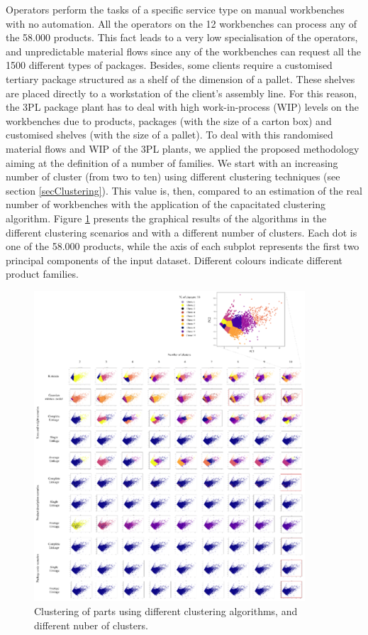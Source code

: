 Operators perform the tasks of a specific service type on manual workbenches with no automation. All the operators on the 12 workbenches can process any of the 58.000 products. This fact leads to a very low specialisation of the operators, and unpredictable material flows since any of the workbenches can request all the 1500 different types of packages. Besides, some clients require a customised tertiary package structured as a shelf of the dimension of a pallet. These shelves are placed directly to a workstation of the client’s assembly line. For this reason, the 3PL package plant has to deal with high work-in-process (WIP) levels on the workbenches due to products, packages (with the size of a carton box) and customised shelves (with the size of a pallet). To deal with this randomised material flows and WIP of the 3PL plants, we applied the proposed methodology aiming at the definition of a number of families. We start with an increasing number of cluster (from two to ten) using different clustering techniques (see section \ref{secClustering}). This value is, then, compared to an estimation of the real number of workbenches with the application of the capacitated clustering algorithm. Figure \ref{fig_prod_CHIMAR_clustering} presents the graphical results of the algorithms in the different clustering scenarios and with a different number of clusters. Each dot is one of the 58.000 products, while the axis of each subplot represents the first two principal components of the input dataset. Different colours indicate different product families. 

\begin{figure}[hbt!]
\centering
\includegraphics[width=0.9\textwidth]{sectionProduction/design_plant_figures/fig_prod_CHIMAR_clustering.png}
\captionsetup{type=figure}
\caption{Clustering of parts using different clustering algorithms, and different nuber of clusters.}
\label{fig_prod_CHIMAR_clustering}
\end{figure}


